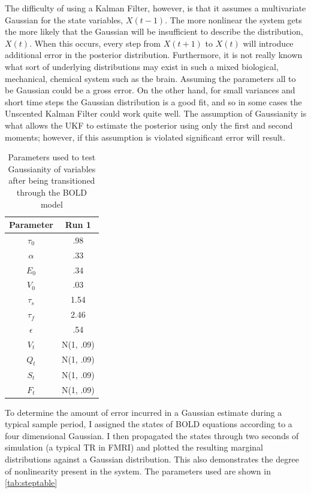 The difficulty
of using a Kalman Filter, however, is that it assumes a multivariate 
Gaussian for the state variables, $X(t-1)$. The more nonlinear the system
gets the more likely that the Gaussian will be insufficient to describe
the distribution, $X(t)$. When this occurs, every step from  $X(t+1)$ 
to $X(t)$ will introduce additional
error in the posterior distribution. Furthermore, it is not really known what 
sort of underlying distributions may exist in such a mixed biological,
mechanical, chemical system such as the brain. Assuming the parameters
all to be Gaussian could be a gross error. On the other hand, for
small variances and short time steps the Gaussian distribution is a good 
fit, and so in some cases the Unscented Kalman Filter could work quite
well. The assumption of Gaussianity is what allows
the UKF to estimate the posterior using only the first and second moments;
however, if this assumption is violated significant error will result.

\begin{table}[t]
\centering
\begin{tabular}{|c || c |}
\hline 
Parameter & Run 1 \\
\hline
$\tau_0$ & .98  \\
$\alpha$ & .33 \\
$E_0$ & .34  \\
$V_0$ & .03  \\
$\tau_s$ & 1.54  \\
$\tau_f$ & 2.46  \\
$\epsilon$ & .54  \\
$V_t$ & N(1, .09)  \\
$Q_t$ & N(1, .09)  \\
$S_t$ & N(1, .09) \\
$F_t$ & N(1, .09) \\
\hline
\end{tabular}
\caption{Parameters used to test Gaussianity of variables after being transitioned through
the BOLD model}
\label{tab:steptable} 
\end{table}

To determine the amount of error incurred in a Gaussian estimate during
a typical sample period, I assigned the states of BOLD equations according
to a four dimensional Gaussian. I then propagated the states through 
two seconds of simulation (a typical TR in FMRI) and plotted the resulting
marginal distributions against a Gaussian distribution. This also demonstrates
the degree of nonlinearity present in the system. The parameters used are 
shown in \autoref{tab:steptable}

